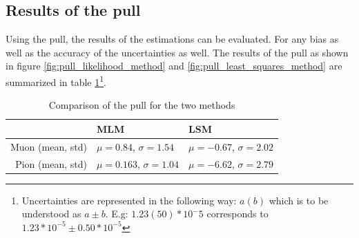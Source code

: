 \documentclass[11pt, a4paper, oneside]{book}
\newcommand{\pion}{$\pi^{-}$}
\newcommand{\muon}{$\mu^{-}$}
\begin{document}
\subsection{Results of the pull} 

Using the pull, the results of the estimations can be evaluated. For any bias as well as the accuracy of the uncertainties as well. The results of the pull as shown in figure \ref{fig:pull_likelihood_method} and \ref{fig:pull_least_squares_method} are summarized in table \ref{tab:pull_results}\footnote{Uncertainties are represented in the following way: $a(b)$ which is to be understood as $a \pm b$. E.g: $1.23(50)*10^-5$ corresponds to $1.23*10^{-5} \pm 0.50 * 10^{-5}$}.


\begin{table}[H]
\centering
  \caption{Comparison of the pull for the two methods}
  \label{tab:pull_results}
  \begin{tabular}{r|ll}
                   & MLM                                & LSM \\ \hline
  Muon (mean, std) & $\mu = 0.84$, $\sigma = 1.54 $     & $\mu = -0.67$, $\sigma = 2.02$  \\
  Pion (mean, std) & $\mu = 0.163$, $\sigma = 1.04$     & $\mu = -6.62$, $\sigma = 2.79$ 
  \end{tabular}
\end{table}

\end{document}
